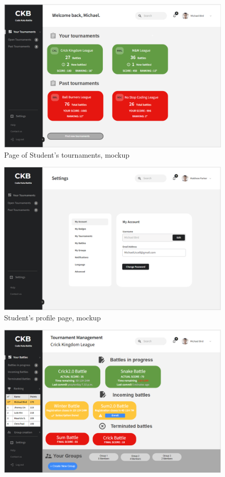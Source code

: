 \documentclass{article}
\begin{document}
{\begin{figure}[H]
    \hspace*{-0.2cm}\includegraphics[scale=0.52]{UserInterface/StudentTournament.png}
    \caption{Page of Student's tournaments, mockup}
    \label{fig:studentTournamentsPageMockup}
\end{figure}
\begin{figure}[H]
    \centering
    \hspace*{-0.2cm}\includegraphics[scale=0.52]{UserInterface/StudentProfile.png}
    \caption{Student's profile page, mockup}
    \label{fig:studentProfilePageMockup}
\end{figure}
\begin{figure}[H]
    \centering
    \hspace*{-0.2cm}\includegraphics[scale=0.52]{UserInterface/StudentBattles.png}

\end{figure}}
\end{document}
